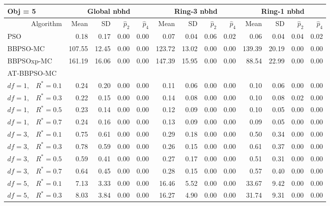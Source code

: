 \documentclass[12pt]{article}
\begin{document}
\begin{table}[ht]
\centering
\footnotesize{
\begin{tabular}{r|rrrr|rrrr|rrrr}
\multicolumn{1}{l}{Obj = 5} & \multicolumn{4}{c}{Global nbhd} & \multicolumn{4}{c}{Ring-3 nbhd} & \multicolumn{4}{c}{Ring-1 nbhd}\\
  \hline
Algorithm & Mean & SD & $\widehat{p}_2$ & $\widehat{p}_4$ & Mean & SD & $\widehat{p}_2$ & $\widehat{p}_4$ & Mean & SD & $\widehat{p}_2$ & $\widehat{p}_4$ \\ 
  \hline
\multicolumn{1}{l|}{PSO} & 0.18 & 0.17 & 0.00 & 0.00 & 0.07 & 0.04 & 0.06 & 0.02 & 0.06 & 0.04 & 0.04 & 0.02 \\ 
  \multicolumn{1}{l|}{BBPSO-MC} & 107.55 & 12.45 & 0.00 & 0.00 & 123.72 & 13.02 & 0.00 & 0.00 & 139.39 & 20.19 & 0.00 & 0.00 \\ 
  \multicolumn{1}{l|}{BBPSOxp-MC} & 161.19 & 16.06 & 0.00 & 0.00 & 147.39 & 15.95 & 0.00 & 0.00 & 88.54 & 22.99 & 0.00 & 0.00 \\ 
\hline
\multicolumn{1}{l|}{AT-BBPSO-MC} &&&&&&&&&&&&\\
  $df = 1,\enspace$ $R^* =0.1$ & 0.24 & 0.20 & 0.00 & 0.00 & 0.11 & 0.06 & 0.00 & 0.00 & 0.10 & 0.06 & 0.00 & 0.00 \\ 
  $df = 1,\enspace$ $R^* =0.3$ & 0.22 & 0.15 & 0.00 & 0.00 & 0.14 & 0.08 & 0.00 & 0.00 & 0.10 & 0.08 & 0.02 & 0.00 \\ 
  $df = 1,\enspace$ $R^* =0.5$ & 0.23 & 0.14 & 0.00 & 0.00 & 0.12 & 0.09 & 0.00 & 0.00 & 0.10 & 0.05 & 0.00 & 0.00 \\ 
  $df = 1,\enspace$ $R^* =0.7$ & 0.24 & 0.16 & 0.00 & 0.00 & 0.13 & 0.09 & 0.00 & 0.00 & 0.09 & 0.05 & 0.00 & 0.00 \\ 
  $df = 3,\enspace$ $R^* =0.1$ & 0.75 & 0.61 & 0.00 & 0.00 & 0.29 & 0.18 & 0.00 & 0.00 & 0.50 & 0.34 & 0.00 & 0.00 \\ 
  $df = 3,\enspace$ $R^* =0.3$ & 0.78 & 0.59 & 0.00 & 0.00 & 0.26 & 0.15 & 0.00 & 0.00 & 0.61 & 0.37 & 0.00 & 0.00 \\ 
  $df = 3,\enspace$ $R^* =0.5$ & 0.59 & 0.41 & 0.00 & 0.00 & 0.27 & 0.17 & 0.00 & 0.00 & 0.51 & 0.31 & 0.00 & 0.00 \\ 
  $df = 3,\enspace$ $R^* =0.7$ & 0.64 & 0.45 & 0.00 & 0.00 & 0.28 & 0.15 & 0.00 & 0.00 & 0.57 & 0.40 & 0.00 & 0.00 \\ 
  $df = 5,\enspace$ $R^* =0.1$ & 7.13 & 3.33 & 0.00 & 0.00 & 16.46 & 5.52 & 0.00 & 0.00 & 33.67 & 9.42 & 0.00 & 0.00 \\ 
  $df = 5,\enspace$ $R^* =0.3$ & 8.03 & 3.84 & 0.00 & 0.00 & 16.27 & 4.90 & 0.00 & 0.00 & 31.74 & 9.31 & 0.00 & 0.00 \\ 

\end{tabular}}
\end{table}
\end{document}
